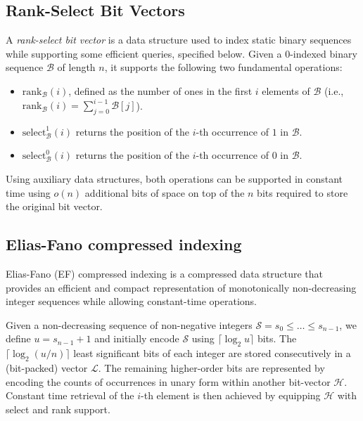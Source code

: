 \subsection{Rank-Select Bit Vectors}

A \emph{rank-select bit vector} \cite[Section~15.1]{PearlsAE} is a data structure used to index static binary sequences while supporting some efficient queries, specified below. Given a $0$-indexed binary sequence $\mathcal B$ of length $n$, it supports the following two fundamental operations:

\begin{itemize}
  \item $\mathrm{rank}_{\mathcal B}(i)$, defined as the number of ones in the first $i$ elements of $\mathcal B$ (i.e., $\mathrm{rank}_\mathcal B(i) = \sum_{j = 0}^{i - 1} \mathcal B[j]$).
  \item $\mathrm{select}_\mathcal{B}^1(i)$ returns the position of the $i$-th occurrence of $1$ in $\mathcal B$.
  \item $\mathrm{select}_{\mathcal B}^0(i)$ returns the position of the $i$-th occurrence of $0$ in $\mathcal B$.
\end{itemize}

Using auxiliary data structures, both operations can be supported in constant time using $o(n)$ additional bits of space on top of the $n$ bits required to store the original bit vector.



\subsection{Elias-Fano compressed indexing}
Elias-Fano (EF) compressed indexing \cite{EFVigna} is a compressed data structure that provides an efficient and compact representation of monotonically non-decreasing integer sequences while allowing constant-time operations.

Given a non-decreasing sequence of non-negative integers \( \mathcal S = s_0 \le \dots \le s_{n - 1} \), we define \( u = s_{n - 1} + 1 \) and initially encode \( \mathcal S \) using \(\lceil \log_2 u \rceil\) bits. The \(\lceil \log_2(u/n) \rceil \) least significant bits of each integer are stored consecutively in a (bit-packed) vector \( \mathcal L \). The remaining higher-order bits are represented by encoding the counts of occurrences in unary form within another bit-vector \( \mathcal H \). Constant time retrieval of the $i$-th element is then achieved by equipping $\mathcal H$ with select and rank support.

